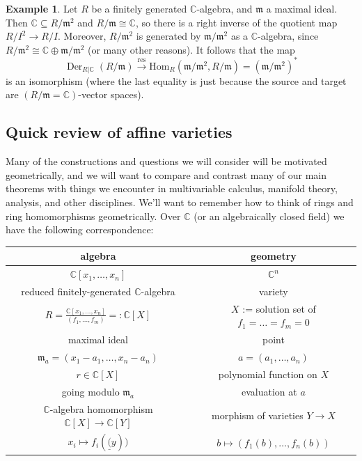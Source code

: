 \documentclass{amsart}[12pt]
\def\Der{\operatorname{Der}}
\newcommand{\Hom}{\mathrm{Hom}}
\newcommand{\C}{\mathbb{C}}
\newcommand{\fm}{{\mathfrak m}}
\numberwithin{equation}{section}
\theoremstyle{plain} %
\theoremstyle{definition}
\newtheorem{ex}[equation]{Example}
\theoremstyle{remark}
\newcommand{\ssec}[1]{\subsection{#1}}
\newcommand{\xra}[1]{\xrightarrow{#1}}
\def\res{\operatorname{res}}
\begin{document}
\begin{ex} Let $R$ be a finitely generated $\C$-algebra, and $\fm$ a maximal ideal. Then $\C\subseteq R/\fm^2$ and $R/\fm\cong \C$, so there is a right inverse of the quotient map $R/I^2 \to R/I$. Moreover, $R/\fm^2$ is generated by $\fm/\fm^2$ as a $\C$-algebra, since $R/\fm^2 \cong \C \oplus \fm/\fm^2$ (or many other reasons). It follows that the map
\[ \Der_{R|\C}(R/\fm) \xra{\res} \Hom_{{R}}(\fm/\fm^2,R/\fm) = (\fm/\fm^2)^*\]
is an isomorphism (where the last equality is just because the source and target are $(R/\fm=\C)$-vector spaces).
\end{ex}


\ssec{Quick review of affine varieties}

Many of the constructions and questions we will consider will be motivated geometrically, and we will want to compare and contrast many of our main theorems with things we encounter in multivariable calculus, manifold theory, analysis, and other disciplines. We'll want to remember how to think of rings and ring homomorphisms geometrically. Over $\C$ (or an algebraically closed field) we have the following correspondence:

\begin{center}
\begin{tabular}{c|c}
algebra & geometry \\ \hline \hline
$\C[x_1,\dots,x_n]$ & $\C^n$ \\ \hline
 reduced finitely-generated $\C$-algebra & variety \\ \hline
 $R=\displaystyle\frac{ \C[x_1,\dots,x_n]}{(f_1,\dots,f_m)}=:\C[X]$ & $X$ := solution set of $f_1=\dots=f_m=0$ \\ \hline

maximal ideal & point \\
$\fm_a = (x_1-a_1,\dots,x_n-a_n)$ & $a=(a_1,\dots,a_n)$ \\ \hline
$r\in \C[X]$ & polynomial function on $X$ \\ \hline
going modulo $\fm_a$ & evaluation at $a$ \\ \hline
$\C$-algebra homomorphism $\C[X]\to \C[Y]$  & morphism of varieties $Y\to X$ \\
$x_i \mapsto f_i(\underline(y))$ & $b\mapsto (f_1(b), \dots,f_n(b))$
\end{tabular}
\end{center}
\end{document}
